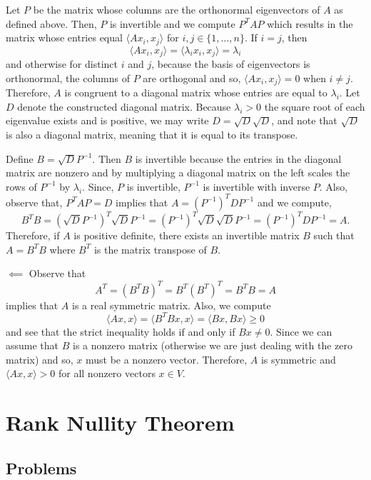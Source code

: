 \documentclass{article}
\begin{document}
Let $P$ be the matrix whose columns are the orthonormal eigenvectors of $A$ as defined above. Then, $P$ is invertible and we compute $P^T A P$ which results in the matrix whose entries equal $\langle Ax_i, x_j\rangle$ for $i,j\in\{1,\dots, n\}$. If $i = j$, then 
\[ \langle Ax_i, x_j \rangle = \langle \lambda_i x_i, x_j \rangle = \lambda_i \]
and otherwise for distinct $i$ and $j$, because the basis of eigenvectors is orthonormal, the columns of $P$ are orthogonal and so, $\langle Ax_i, x_j \rangle = 0$ when $i\neq j$. Therefore, $A$ is congruent to a diagonal matrix whose entries are equal to $\lambda_i$. Let $D$ denote the constructed diagonal matrix. Because $\lambda_i>0$ the square root of each eigenvalue exists and is positive, we may write $D = \sqrt{D}\sqrt{D}$, and note that $\sqrt{D}$ is also a diagonal matrix, meaning that it is equal to its transpose. 

Define $B = \sqrt{D}P^{-1}$. Then $B$ is invertible because the entries in the diagonal matrix are nonzero and by multiplying a diagonal matrix on the left scales the rows of $P^{-1}$ by $\lambda_i$. Since, $P$ is invertible, $P^{-1}$ is invertible with inverse $P$. Also, observe that, $P^T A P = D$ implies that $A = (P^{-1})^T D P^{-1}$ and we compute, 
	\[ B^T B = (\sqrt{D}P^{-1})^T \sqrt{D}P^{-1} = (P^{-1})^T \sqrt{D}\sqrt{D}P^{-1} = (P^{-1})^T D P^{-1} = A.\]
Therefore, if $A$ is positive definite, there exists an invertible matrix $B$ such that $A = B^TB$ where $B^T$ is the matrix transpose of $B$.

$\impliedby$ Observe that 
	\[A ^T = (B^TB)^T = B^T (B^T)^T = B^T B = A\]
	implies that $A$ is a real symmetric matrix. Also, we compute
	\[ \langle Ax, x \rangle = \langle B^T Bx, x \rangle = \langle Bx, Bx \rangle \geq 0\]
	and see that the strict inequality holds if and only if $Bx\neq 0$. Since we can assume that $B$ is a nonzero matrix (otherwise we are 
	just dealing with the zero matrix) and so, $x$ must be a nonzero vector. Therefore, $A$ is symmetric and $\langle Ax, x \rangle > 0 $ 
	for all nonzero vectors $x\in V$.
	
\break 

\section{Rank Nullity Theorem}

\subsection{Problems}
\end{document}
